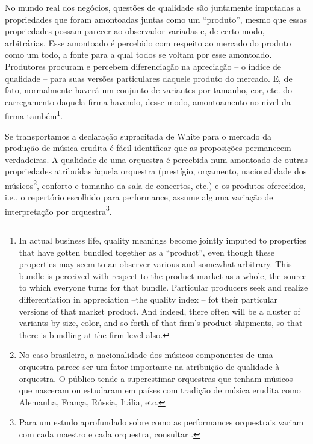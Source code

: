 \documentclass[a4paper, 12pt, openright, oneside, german, french, english, brazil]{abntex2}
\begin{document}
	\begin{citacao}
		No mundo real dos negócios, questões de qualidade são juntamente imputadas a propriedades que foram amontoadas juntas como um ``produto'', mesmo que essas propriedades possam parecer ao observador variadas e, de certo modo, arbitrárias. Esse amontoado é percebido com respeito ao mercado do produto como um todo, a fonte para a qual todos se voltam por esse amontoado. Produtores procuram e percebem diferenciação na apreciação -- o índice de qualidade -- para suas versões particulares daquele produto do mercado. E, de fato, normalmente haverá um conjunto de variantes por tamanho, cor, etc. do carregamento daquela firma havendo, desse modo, amontoamento no nível da firma também\footnote{In actual business life, quality meanings become jointly imputed to properties that have gotten bundled together as a ``product'', even though these properties may seem to an observer various and somewhat arbitrary. This bundle is perceived with respect to the product market as a whole, the source to which everyone turns for that bundle. Particular producers seek and realize differentiation in appreciation --the quality index -- fot their particular versions of that market product. And indeed, there often will be a cluster of variants by size, color, and so forth of that firm's product shipments, so that there is bundling at the firm level also.}. \cite[p. 10, tradução do autor]{white2002markets}
	\end{citacao}
	
	Se transportamos a declaração supracitada de White para o mercado da produção de música erudita é fácil identificar que as proposições permanecem verdadeiras. A qualidade de uma orquestra é percebida num amontoado de outras propriedades atribuídas àquela orquestra (prestígio, orçamento, nacionalidade dos músicos\footnote{No caso brasileiro, a nacionalidade dos músicos componentes de uma orquestra parece ser um fator importante na atribuição de qualidade à orquestra. O público tende a superestimar orquestras que tenham músicos que nasceram ou estudaram em países com tradição de música erudita como Alemanha, França, Rússia, Itália, etc.}, conforto e tamanho da sala de concertos, etc.) e os produtos oferecidos, i.e., o repertório escolhido para performance, assume alguma variação de interpretação por orquestra\footnote{Para um estudo aprofundado sobre como as performances orquestrais variam com cada maestro e cada orquestra, consultar .}.
	
\end{document}
